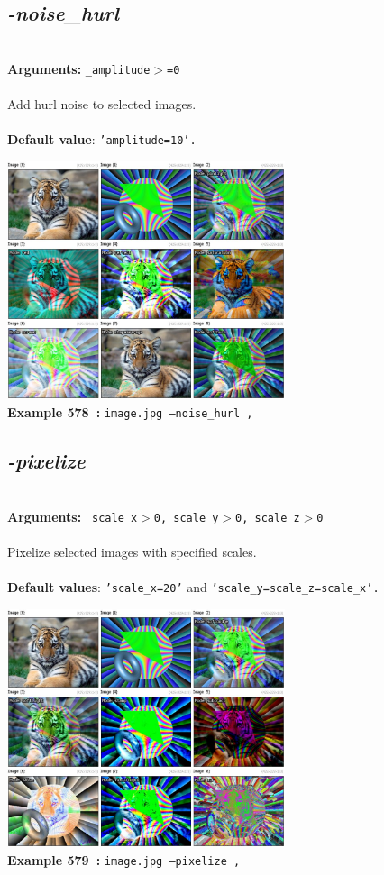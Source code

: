 \documentclass[a4paper,11pt,twoside]{book}
\begin{document}
\subsection{\emph{-noise\_hurl} }\vspace*{-0.5em}
~\\\textbf{Arguments: } 
{\small \texttt{\_amplitude$>$=0}}\\~\\
Add hurl noise to selected images.
~\\~\\\textbf{Default value}: {\small \texttt{'amplitude=10'.}}
\begin{center}\includegraphics[keepaspectratio=true,height=7cm,width=\textwidth]{img/gmic_def578.jpg}\\
{\footnotesize \textbf{Example 578~:} \texttt{image.jpg --noise\_hurl ,}}
\end{center}

\subsection{\emph{-pixelize} }\vspace*{-0.5em}
~\\\textbf{Arguments: } 
{\small \texttt{\_scale\_x$>$0,\_scale\_y$>$0,\_scale\_z$>$0}}\\~\\
Pixelize selected images with specified scales.
~\\~\\\textbf{Default values}: {\small \texttt{'scale\_x=20'} and \texttt{'scale\_y=scale\_z=scale\_x'.}}
\begin{center}\includegraphics[keepaspectratio=true,height=7cm,width=\textwidth]{img/gmic_def579.jpg}\\
{\footnotesize \textbf{Example 579~:} \texttt{image.jpg --pixelize ,}}
\end{center}
\end{document}

